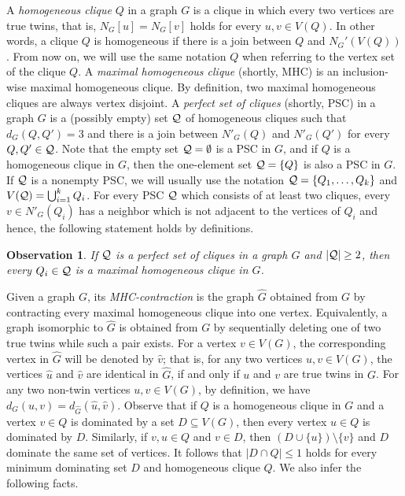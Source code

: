 \documentclass[12pt]{article}
\newtheorem{observation}[theorem]{Observation}
\newcommand{\cQ}{{\cal Q}}
\begin{document}
A \emph{homogeneous clique} $Q$ in a graph $G$ is a clique in which every two vertices are true twins, that is, $N_G[u] = N_G[v]$ holds for every $u,v \in V(Q)$. In other words, a clique $Q$ is homogeneous if there is a join between $Q$ and $N_G'(V(Q))$. From now on, we will use the same notation $Q$ when referring to the vertex set of the clique $Q$. A \emph{maximal homogeneous clique} (shortly, MHC) is an inclusion-wise maximal homogeneous clique.  By definition, two maximal homogeneous cliques are always vertex disjoint. A \emph{perfect set of cliques} (shortly, PSC) in a graph $G$ is a (possibly empty) set $\cQ$ of homogeneous cliques such that $d_G(Q, Q') = 3$ and there is a join between  $N'_G(Q)$ and $N'_G(Q')$ for every $Q, Q'\in \cQ$. Note that the empty set $\cQ= \emptyset$ is a PSC in $G$, and if $Q$ is a homogeneous clique in $G$, then the one-element set $\cQ=\{Q\}$ is also a PSC in $G$. If $\cQ$ is a nonempty PSC, we will usually use the notation $\cQ=\{Q_1,\dots, Q_k\}$ and $V(\cQ)=\bigcup_{i=1}^k Q_i$. For every PSC $\cQ$ which consists of at least two cliques, every $v\in N'_G(Q_i)$ has a neighbor which is not adjacent to the vertices of $Q_i$ and hence, the following statement holds by definitions.

\begin{observation}
	If $\cQ$ is a perfect set of cliques in a graph $G$ and $|\cQ|\ge 2$, then every $Q_i \in \cQ$ is a maximal homogeneous clique in $G$. 
\end{observation}

Given a graph $G$, its \emph{MHC-contraction} is the graph $\widehat{G}$ obtained from $G$ by contracting every maximal homogeneous clique into one vertex. Equivalently, a graph isomorphic to $\widehat{G}$ is obtained from $G$ by sequentially deleting one of two true twins while such a pair exists. For a vertex $v \in V(G)$, the corresponding vertex in $\widehat{G}$ will be denoted by $\widehat{v}$; that is, for any two vertices $u,v \in V(G)$, the vertices $\widehat{u}$ and $\widehat{v}$ are identical in $\widehat{G}$, if and only if $u$ and $v$ are true twins in $G$. For any two non-twin vertices $u,v\in V(G)$, by definition, we have $d_G(u,v)=d_{\widehat{G}}(\widehat{u},\widehat{v})$. Observe that if $Q$ is a homogeneous clique in $G$ and a vertex $v \in Q$ is dominated by a set $D \subseteq V(G)$, then every vertex $u\in Q$ is dominated by $D$. Similarly, if $v,u \in Q$ and $v\in D$, then $(D \cup \{u\}) \setminus \{v\}$ and $D$ dominate the same set of vertices. It follows that $|D\cap Q| \le 1$ holds for every minimum dominating set $D$ and homogeneous clique $Q$. We also infer the following facts.
\end{document}
